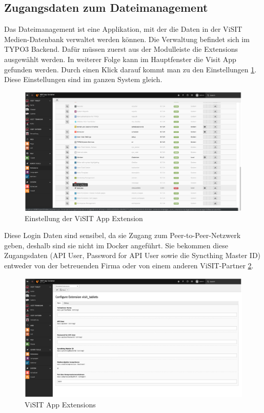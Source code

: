 \subsection{Zugangsdaten zum Dateimanagement}
Das Dateimanagement ist eine Applikation, mit der die Daten in der ViSIT Medien-Datenbank verwaltet werden können. Die Verwaltung befindet sich im TYPO3 Backend. Dafür müssen zuerst aus der Modulleiste die Extensions ausgewählt werden. In weiterer Folge kann im Hauptfenster die Visit App gefunden werden. Durch einen Klick darauf kommt man zu den Einstellungen \ref{img:einstellung_extension}. Diese Einstellungen sind im ganzen System gleich.
\begin{figure}[ht!]
\centering
\includegraphics[width=12cm]{Figures/paula/dateiverwaltung/einstellung_extension.png}
\caption{Einstellung der ViSIT App Extension}
\label{img:einstellung_extension}
\end{figure}
Diese Login Daten sind sensibel, da sie Zugang zum Peer-to-Peer-Netzwerk geben, deshalb sind sie nicht im Docker angeführt. Sie bekommen diese Zugangsdaten (API User, Password for API User sowie die Syncthing Master ID) entweder von der betreuenden Firma oder von einem anderen ViSIT-Partner \ref{img:extensions}.\\

\begin{figure}[ht!]
\centering
\includegraphics[width=12cm]{Figures/paula/dateiverwaltung/extensions.png}
\caption{ViSIT App Extensions}
\label{img:extensions}
\end{figure}


